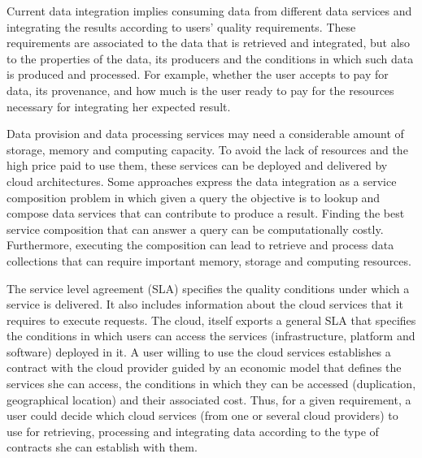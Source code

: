 Current data integration implies consuming data from different data services and integrating the results according to users' quality requirements. These requirements are associated to the data that is retrieved and integrated, but also to the properties of the data, its producers and the conditions in which such data is produced and processed. For example, whether the user accepts to pay for data, its provenance, and how much is the user ready to pay for the resources necessary for integrating her expected result. 

Data provision and data processing services may need a considerable amount of storage, memory and computing capacity. To avoid the lack of resources and the high price paid to use them, these services can be deployed and delivered by cloud architectures. Some approaches express the data integration as a service composition problem in which given a query the objective is to lookup and compose data services that can contribute to produce a result.
Finding the best service composition that can answer a query can be computationally costly. Furthermore, executing the composition can lead to retrieve and process data collections that can require important memory, storage and computing resources.

The service level agreement (SLA) specifies the quality conditions under which a service is delivered. It also includes information about the cloud services that it requires to execute requests. The cloud, itself exports a general SLA that specifies the conditions in which users can access the services (infrastructure, platform and software) deployed in it. A user willing to use the cloud services establishes a contract with the cloud provider guided by an economic model that defines the services she can access, the conditions in which they can be accessed (duplication, geographical location) and their associated cost. Thus, for a given requirement, a user could decide which cloud services (from one or several cloud providers) to use for retrieving, processing and integrating data according to the type of contracts she can establish with them.

